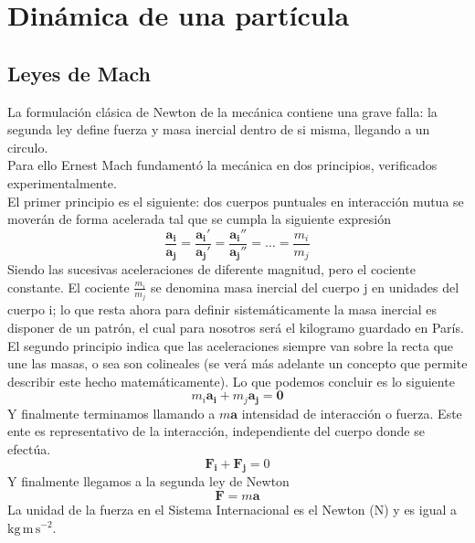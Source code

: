 \documentclass[a4paper]{article}
\numberwithin{equation}{section}
\begin{document}
\section{Dinámica de una partícula}
	\subsection{Leyes de Mach}
	La formulación clásica de Newton de la mecánica contiene una grave falla: la segunda ley define fuerza y masa inercial dentro de si misma, llegando a un circulo.\\
	Para ello Ernest Mach fundamentó la mecánica en dos principios, verificados experimentalmente. \\
	El primer principio es el siguiente: dos cuerpos puntuales en interacción mutua se moverán de forma acelerada tal que se cumpla la siguiente expresión
	\begin{equation}
		\frac{\boldsymbol{a_i}}{\boldsymbol{a_j}} = \frac{\boldsymbol{a_i'}}{\boldsymbol{a_j'}} = \frac{\boldsymbol{a_i''}}{\boldsymbol{a_j''}} = \dots = \frac{m_i}{m_j}
	\end{equation}
	Siendo las sucesivas aceleraciones de diferente magnitud, pero el cociente constante. El cociente $\frac{m_i}{m_j}$ se denomina masa inercial del cuerpo j en unidades del cuerpo i; lo que resta ahora para definir sistemáticamente la masa inercial es disponer de un patrón, el cual para nosotros será el kilogramo guardado en París.\\
	El segundo principio indica que las aceleraciones siempre van sobre la recta que une las masas, o sea son colineales (se verá más adelante un concepto que permite describir este hecho matemáticamente). Lo que podemos concluir es lo siguiente
	\begin{equation}
		m_i \boldsymbol{a_i} + m_j \boldsymbol{a_j} = \boldsymbol{0} \label{eq:mach1}
	\end{equation}
	Y finalmente terminamos llamando a $m \boldsymbol{a}$ intensidad de interacción o fuerza. Este ente es representativo de la interacción, independiente del cuerpo donde se efectúa.
	\begin{equation}
		\boldsymbol{F_i} + \boldsymbol{F_j} = 0
	\end{equation}
	Y finalmente llegamos a la segunda ley de Newton
	\begin{equation}
		\boldsymbol{F} = m \boldsymbol{a}
	\end{equation}
	La unidad de la fuerza en el Sistema Internacional es el Newton (N) y es igual a $\text{kg} \, \text{m} \, \text{s}^{-2}$.\\
\end{document}
